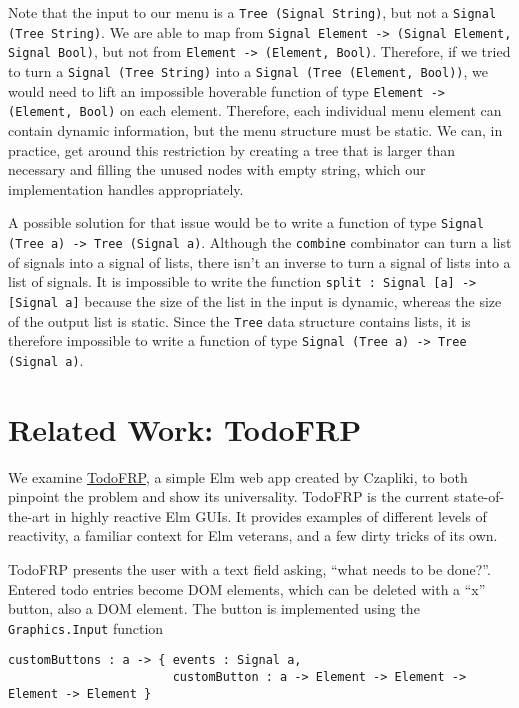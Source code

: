 \documentclass{article}
\begin{document}
Note that the input to our menu is a \texttt{Tree (Signal String)}, but
not a \texttt{Signal (Tree String)}. We are able to map from
\texttt{Signal Element -\textgreater{} (Signal Element, Signal Bool)},
but not from \texttt{Element -\textgreater{} (Element, Bool)}.
Therefore, if we tried to turn a \texttt{Signal (Tree String)} into a
\texttt{Signal (Tree (Element, Bool))}, we would need to lift an
impossible hoverable function of type
\texttt{Element -\textgreater{} (Element, Bool)} on each element.
Therefore, each individual menu element can contain dynamic information,
but the menu structure must be static. We can, in practice, get around
this restriction by creating a tree that is larger than necessary and
filling the unused nodes with empty string, which our implementation
handles appropriately.

A possible solution for that issue would be to write a function of type
\texttt{Signal (Tree a) -\textgreater{} Tree (Signal a)}. Although the
\texttt{combine} combinator can turn a list of signals into a signal of
lists, there isn't an inverse to turn a signal of lists into a list of
signals. It is impossible to write the function
\texttt{split : Signal {[}a{]} -\textgreater{} {[}Signal a{]}} because
the size of the list in the input is dynamic, whereas the size of the
output list is static. Since the \texttt{Tree} data structure contains
lists, it is therefore impossible to write a function of type
\texttt{Signal (Tree a) -\textgreater{} Tree (Signal a)}.

\section{Related Work: TodoFRP}\label{related-work-todofrp}

We examine \href{https://github.com/evancz/TodoFRP}{TodoFRP}, a simple
Elm web app created by Czapliki, to both pinpoint the problem and show
its universality. TodoFRP is the current state-of-the-art in highly
reactive Elm GUIs. It provides examples of different levels of
reactivity, a familiar context for Elm veterans, and a few dirty tricks
of its own.

TodoFRP presents the user with a text field asking, ``what needs to be
done?''. Entered todo entries become DOM elements, which can be deleted
with a ``x'' button, also a DOM element. The button is implemented using
the \texttt{Graphics.Input} function

\begin{verbatim}
customButtons : a -> { events : Signal a,
                       customButton : a -> Element -> Element -> Element -> Element }
\end{verbatim}
\end{document}
